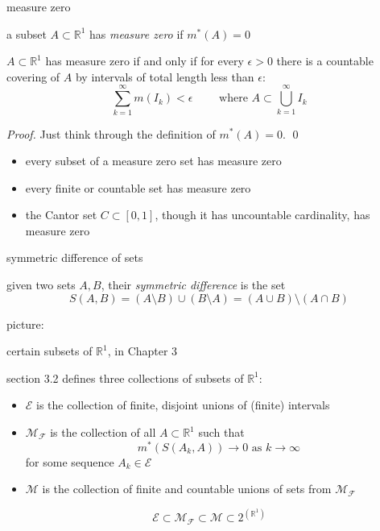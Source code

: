 \documentclass[10pt,
               svgnames,
               hyperref={colorlinks,
                         citecolor=DeepPink4,
                         linkcolor=FireBrick,
                         urlcolor=blue},
               usepdftitle=false]{beamer}
\newcommand{\cE}{\mathcal{E}}
\newcommand{\cF}{\mathcal{F}}
\newcommand{\cM}{\mathcal{M}}
\newcommand{\RR}{\mathbb{R}}
\newcommand{\eps}{\epsilon}
\begin{document}
\begin{frame}{measure zero}

\begin{definition}
a subset $A\subset \RR^1$ has \emph{measure zero} if $m^*(A)=0$
\end{definition}

\begin{lemma}
$A\subset \RR^1$ has measure zero if and only if for every $\eps>0$ there is a countable covering of $A$ by intervals of total length less than $\eps$:
	$$\sum_{k=1}^\infty m(I_k) < \eps \qquad \text{ where } A \subset \bigcup_{k=1}^\infty I_k$$
\end{lemma}

{\small \noindent \emph{Proof.}
Just think through the definition of $m^*(A)=0$.  \qed
}

\bigskip
\begin{itemize}
\item every subset of a measure zero set has measure zero
\item every finite or countable set has measure zero
\item the Cantor set $C\subset[0,1]$, though it has uncountable cardinality, has measure zero
\end{itemize}
\end{frame}


\begin{frame}{symmetric difference of sets}

\begin{definition}
given two sets $A,B$, their \emph{symmetric difference} is the set
	$$S(A,B) = (A \setminus B) \cup (B \setminus A) = (A \cup B) \setminus (A\cap B)$$
\end{definition}

\medskip \noindent picture:

\vspace{60mm}
\end{frame}


\begin{frame}{certain subsets of $\RR^1$, in Chapter 3}

\begin{definition}
section 3.2 defines three collections of subsets of $\RR^1$:
\begin{itemize}
\item {\large $\cE$} is the collection of finite, disjoint unions of (finite) intervals
\item {\large $\cM_\cF$} is the collection of all $A\subset \RR^1$ such that
	$$m^*(S(A_k,A)) \to 0 \text{ as } k \to \infty$$
for some sequence $A_k \in \cE$
\item {\large $\cM$} is the collection of finite and countable unions of sets from $\cM_\cF$
\end{itemize}
\end{definition}

\vspace{10mm}

{\large
	$$\cE \subset \cM_{\cF} \subset \cM \subset 2^{(\RR^1)}$$
}
\end{frame}
\end{document}
